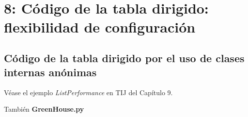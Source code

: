 \section*{\texorpdfstring{8: Código de la tabla dirigido: \newline flexibilidad de configuración}{8: Código Tabla impulsada: flexibilidad de configuración}}
\label{sec:ctifdc}



\subsection*{Código de la tabla dirigido por el uso de clases internas anónimas}
\label{subsec:cdltdpeudcia}

Véase el ejemplo \textit{ListPerformance} en TIJ del Capítulo 9.   \newline

También \textbf{GreenHouse.py}

\newpage
